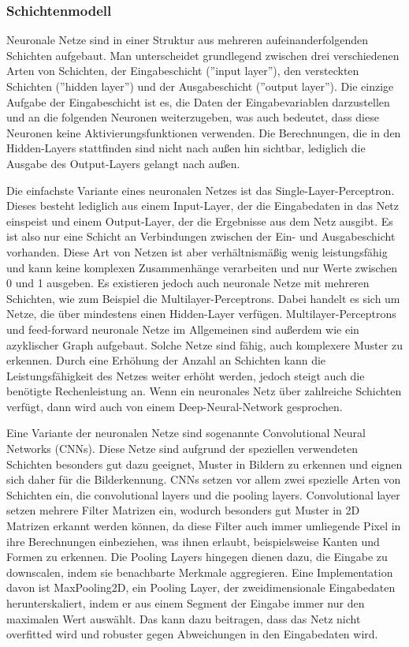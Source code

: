 \subsubsection{Schichtenmodell}\label{subsec:neuronen:schichtenmodell}
Neuronale Netze sind in einer Struktur aus mehreren aufeinanderfolgenden Schichten aufgebaut.
Man unterscheidet grundlegend zwischen drei verschiedenen Arten von Schichten, der Eingabeschicht (''input layer''), den versteckten Schichten (''hidden layer'') und der Ausgabeschicht (''output layer'').
Die einzige Aufgabe der Eingabeschicht ist es, die Daten der Eingabevariablen darzustellen und an die folgenden Neuronen weiterzugeben, was auch bedeutet, dass diese Neuronen keine Aktivierungsfunktionen verwenden.
Die Berechnungen, die in den Hidden-Layers stattfinden sind nicht nach außen hin sichtbar, lediglich die Ausgabe des Output-Layers gelangt nach außen.

\bigbreak\noindent
Die einfachste Variante eines neuronalen Netzes ist das Single-Layer-Perceptron. Dieses besteht lediglich aus einem Input-Layer, der die Eingabedaten in das Netz einspeist und einem Output-Layer, der die Ergebnisse aus dem Netz ausgibt.
Es ist also nur eine Schicht an Verbindungen zwischen der Ein- und Ausgabeschicht vorhanden.
Diese Art von Netzen ist aber verhältnismäßig wenig leistungsfähig und kann keine komplexen Zusammenhänge verarbeiten und nur Werte zwischen 0 und 1 ausgeben.
Es existieren jedoch auch neuronale Netze mit mehreren Schichten, wie zum Beispiel die Multilayer-Perceptrons. Dabei handelt es sich um Netze, die über mindestens einen Hidden-Layer verfügen.
Multilayer-Perceptrons und feed-forward neuronale Netze im Allgemeinen sind außerdem wie ein azyklischer Graph aufgebaut.
Solche Netze sind fähig, auch komplexere Muster zu erkennen.
Durch eine Erhöhung der Anzahl an Schichten kann die Leistungsfähigkeit des Netzes weiter erhöht werden, jedoch steigt auch die benötigte Rechenleistung an.
Wenn ein neuronales Netz über zahlreiche Schichten verfügt, dann wird auch von einem Deep-Neural-Network gesprochen.

\bigbreak\noindent
Eine Variante der neuronalen Netze sind sogenannte Convolutional Neural Networks (CNNs). Diese Netze sind aufgrund der speziellen verwendeten Schichten besonders gut dazu geeignet, Muster in Bildern zu erkennen und eignen sich daher für die Bilderkennung.
CNNs setzen vor allem zwei spezielle Arten von Schichten ein, die convolutional layers und die pooling layers.
Convolutional layer setzen mehrere Filter Matrizen ein, wodurch besonders gut Muster in 2D Matrizen erkannt werden können, da diese Filter auch immer umliegende Pixel in ihre Berechnungen einbeziehen, was ihnen erlaubt, beispielsweise Kanten und Formen zu erkennen.
Die Pooling Layers hingegen dienen dazu, die Eingabe zu downscalen, indem sie benachbarte Merkmale aggregieren. Eine Implementation davon ist MaxPooling2D, ein Pooling Layer, der zweidimensionale Eingabedaten herunterskaliert, indem er aus einem Segment der Eingabe immer nur den maximalen Wert auswählt. Das kann dazu beitragen, dass das Netz nicht overfitted wird und robuster gegen Abweichungen in den Eingabedaten wird.